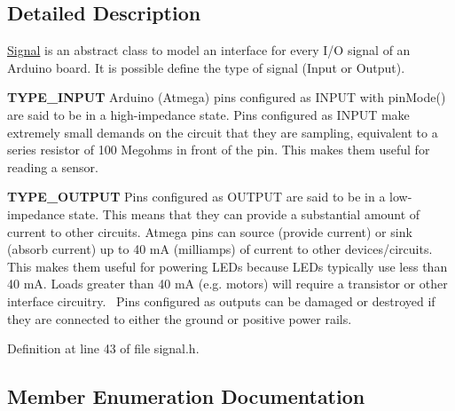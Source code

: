 \subsection{Detailed Description}
\hyperlink{classsmrtobj_1_1io_1_1_signal}{Signal} is an abstract class to model an interface for every I/\+O signal of an Arduino board. It is possible define the type of signal (Input or Output).

{\bfseries T\+Y\+P\+E\+\_\+\+I\+N\+P\+U\+T} Arduino (Atmega) pins configured as I\+N\+P\+U\+T with pin\+Mode() are said to be in a high-\/impedance state. Pins configured as I\+N\+P\+U\+T make extremely small demands on the circuit that they are sampling, equivalent to a series resistor of 100 Megohms in front of the pin. This makes them useful for reading a sensor.

{\bfseries T\+Y\+P\+E\+\_\+\+O\+U\+T\+P\+U\+T} Pins configured as O\+U\+T\+P\+U\+T are said to be in a low-\/impedance state. This means that they can provide a substantial amount of current to other circuits. Atmega pins can source (provide current) or sink (absorb current) up to 40 m\+A (milliamps) of current to other devices/circuits. This makes them useful for powering L\+E\+Ds because L\+E\+Ds typically use less than 40 m\+A. Loads greater than 40 m\+A (e.\+g. motors) will require a transistor or other interface circuitry.~\newline
Pins configured as outputs can be damaged or destroyed if they are connected to either the ground or positive power rails. 

Definition at line 43 of file signal.\+h.



\subsection{Member Enumeration Documentation}
\hypertarget{classsmrtobj_1_1io_1_1_signal_a0566106724452894eae48ec38b66952c}{}
